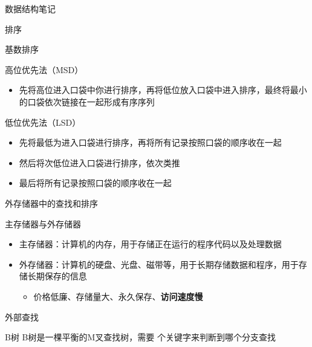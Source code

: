 \documentclass[
  ignorenonframetext,
]{beamer}
\providecommand{\tightlist}{%
  \setlength{\itemsep}{0pt}\setlength{\parskip}{0pt}}
\begin{document}
\begin{frame}[fragile]{数据结构笔记}
\begin{block}{排序}
\begin{block}{基数排序}
\begin{block}{高位优先法（MSD）}
\protect{}\label{ux9ad8ux4f4dux4f18ux5148ux6cd5msd}
\begin{itemize}
\tightlist
\item
  先将高位进入口袋中你进行排序，再将低位放入口袋中进入排序，最终将最小的口袋依次链接在一起形成有序序列
\end{itemize}
\end{block}

\begin{block}{低位优先法（LSD）}
\protect{}\label{ux4f4eux4f4dux4f18ux5148ux6cd5lsd}
\begin{itemize}
\tightlist
\item
  先将最低为进入口袋进行排序，再将所有记录按照口袋的顺序收在一起
\item
  然后将次低位进入口袋进行排序，依次类推
\item
  最后将所有记录按照口袋的顺序收在一起
\end{itemize}
\end{block}
\end{block}
\end{block}

\begin{block}{外存储器中的查找和排序}
\protect{}\label{ux5916ux5b58ux50a8ux5668ux4e2dux7684ux67e5ux627eux548cux6392ux5e8f}
\begin{block}{主存储器与外存储器}
\protect{}\label{ux4e3bux5b58ux50a8ux5668ux4e0eux5916ux5b58ux50a8ux5668}
\begin{itemize}
\tightlist
\item
  主存储器：计算机的内存，用于存储正在运行的程序代码以及处理数据
\item
  外存储器：计算机的硬盘、光盘、磁带等，用于长期存储数据和程序，用于存储长期保存的信息

  \begin{itemize}
  \tightlist
  \item
    价格低廉、存储量大、永久保存、\textbf{访问速度慢}
  \end{itemize}
\end{itemize}
\end{block}

\begin{block}{外部查找}
\protect{}\label{ux5916ux90e8ux67e5ux627e}
\begin{block}{B树}
\protect{}\label{bux6811}
B树是一棵平衡的M叉查找树，需要 {} 个关键字来判断到哪个分支查找


\end{block}
\end{block}
\end{block}
\end{frame}
\end{document}
